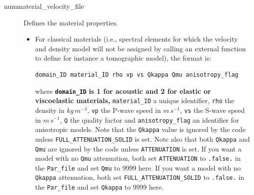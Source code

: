 \begin{description}
\item [{nummaterial\_velocity\_file}] Defines the material properties.

\begin{itemize}
\item For classical materials (i.e., spectral elements for which the velocity
and density model will not be assigned by calling an external function
to define for instance a tomographic model), the format is:

\begin{verbatim}
domain_ID material_ID rho vp vs Qkappa Qmu anisotropy_flag
\end{verbatim}

where \texttt{\textbf{domain\_ID}}\textbf{ is 1 for acoustic and 2
for elastic or viscoelastic materials,} \texttt{material\_ID} a unique
identifier, \texttt{rho} the density in $kg\, m^{-3}$, \texttt{vp}
the P-wave speed in $m\, s^{-1}$, \texttt{vs} the S-wave speed in
$m\, s^{-1}$, \texttt{Q} the quality factor and \texttt{anisotropy\_flag}
an identifier for anisotropic models. Note that the \texttt{Qkappa}
value is ignored by the code unless \texttt{FULL\_ATTENUATION\_SOLID}
is set. Note also that both \texttt{Qkappa} and \texttt{Qmu} are ignored
by the code unless \texttt{ATTENUATION} is set. If you want a model
with no \texttt{Qmu} attenuation, both set \texttt{ATTENUATION} to
\texttt{.false.} in the \texttt{Par\_file} and set \texttt{Qmu} to
9999 here. If you want a model with no \texttt{Qkappa} attenuation,
both set \texttt{FULL\_ATTENUATION\_SOLID} to \texttt{.false.} in
the \texttt{Par\_file} and set \texttt{Qkappa} to 9999 here. %



\end{itemize}
\end{description}
